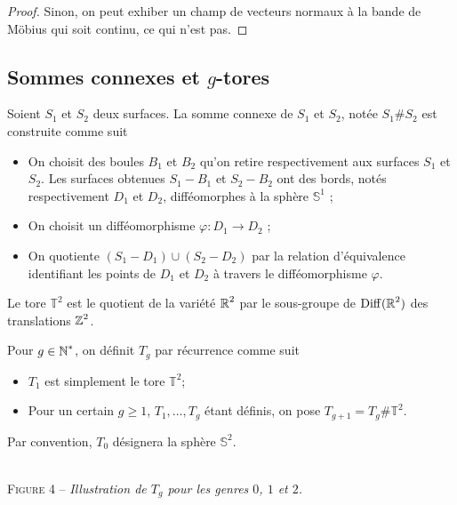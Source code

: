 \begin{proof}
    Sinon, on peut exhiber un champ de vecteurs normaux à la bande de Möbius qui soit continu, 
    ce qui n'est pas. 
\end{proof}



\subsection{Sommes connexes et $g$-tores}
\begin{defi}
    Soient $S_1$ et $S_2$ deux surfaces. 
    La somme connexe de $S_1$ et $S_2$, notée $S_1\#S_2$ est construite comme suit 
    \begin{itemize}
        \item On choisit des boules $B_1$ et $B_2$ qu'on retire respectivement aux surfaces 
        $S_1$ et $S_2$.
        Les surfaces obtenues $S_1-B_1$ et $S_2-B_2$ ont des bords, notés respectivement $D_1$ 
        et $D_2$, difféomorphes à la sphère $\mathbb S^1$ ;
        \item On choisit un difféomorphisme $\varphi:D_1\to D_2$ ;
        \item On quotiente $(S_1-D_1)\cup(S_2-D_2)$ par la relation d'équivalence identifiant 
        les points de $D_1$ et $D_2$ à travers le difféomorphisme $\varphi$.
    \end{itemize}
\end{defi}

Le tore $\mathbb T^2$ est le quotient de la variété $\operatorname{\mathbb R}^2$ par le sous-groupe de $\operatorname{Diff}(\operatorname{\mathbb R}^2)$ 
des translations $\operatorname{\mathbb Z}^2$.

\begin{defi}
    Pour $g\in\operatorname{\mathbb N}^*$, on définit $T_g$ par récurrence comme suit 
    \begin{itemize}
        \item $T_1$ est simplement le tore $\mathbb T^2$;
        \item Pour un certain $g\geq 1$, $T_1,\dots,T_g$ étant définis, on pose 
        $T_{g+1}=T_g\#\mathbb T^2$.
    \end{itemize}
    Par convention, $T_0$ désignera la sphère $\mathbb S^2$.
\end{defi}

\begin{center}
    \\
    \textsc{Figure 4} – \textit{Illustration de $T_g$ pour les genres $0$, $1$ et $2$.}
\end{center}
